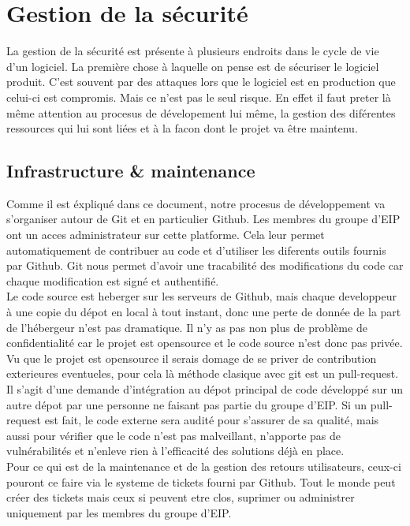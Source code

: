 \section{Gestion de la sécurité}

La gestion de la sécurité est présente à plusieurs endroits dans le cycle de vie d'un logiciel. La première chose à laquelle on pense est de sécuriser le logiciel produit. C'est souvent par des attaques lors que le logiciel est en production que celui-ci est compromis. Mais ce n'est pas le seul risque. En effet il faut preter là même attention au procesus de dévelopement lui même, la gestion des diférentes ressources qui lui sont liées et à la facon dont le projet va être maintenu.

\subsection{Infrastructure \& maintenance}

Comme il est éxpliqué dans ce document, notre procesus de développement va s'organiser autour de Git et en particulier Github. Les membres du groupe d'EIP ont un acces administrateur sur cette platforme. Cela leur permet automatiquement de contribuer au code et d'utiliser les diferents outils fournis par Github. Git nous permet d'avoir une tracabilité des modifications du code car chaque modification est signé et authentifié.\\
Le code source est heberger sur les serveurs de Github, mais chaque developpeur à une copie du dépot en local à tout instant, donc une perte de donnée de la part de l'hébergeur n'est pas dramatique. Il n'y as pas non plus de problème de confidentialité car le projet est opensource et le code source n'est donc pas privée.\\
Vu que le projet est opensource il serais domage de se priver de contribution exterieures eventueles, pour cela là méthode clasique avec git est un pull-request. Il s'agit d'une demande d'intégration au dépot principal de code développé sur un autre dépot par une personne ne faisant pas partie du groupe d'EIP. Si un pull-request est fait, le code externe sera audité pour s'assurer de sa qualité, mais aussi pour vérifier que le code n'est pas malveillant, n'apporte pas de vulnérabilités et n'enleve rien à l'efficacité des solutions déjà en place.\\
Pour ce qui est de la maintenance et de la gestion des retours utilisateurs, ceux-ci pouront ce faire via le systeme de tickets fourni par Github. Tout le monde peut créer des tickets mais ceux si peuvent etre clos, suprimer ou administrer uniquement par les membres du groupe d'EIP.

